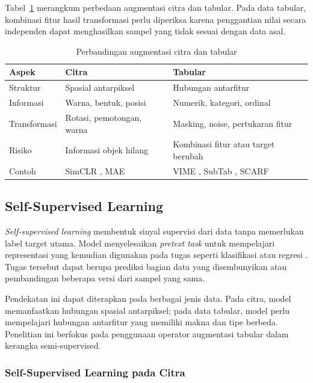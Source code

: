 Tabel~\ref{tab:i} merangkum perbedaan augmentasi citra dan tabular. Pada data tabular, kombinasi fitur hasil transformasi perlu diperiksa karena penggantian nilai secara independen dapat menghasilkan sampel yang tidak sesuai dengan data asal.

\begin{table}[!htbp]
\caption{Perbandingan augmentasi citra dan tabular}
\label{tab:i}
\centering
\footnotesize
\setlength{\tabcolsep}{3pt}
\renewcommand{\arraystretch}{1.1}
\begin{tabularx}{\columnwidth}{p{}XX}
\hline
\textbf{Aspek} & \textbf{Citra} & \textbf{Tabular} \\
\hline
Struktur & Spasial antarpiksel & Hubungan antarfitur \\
Informasi & Warna, bentuk, posisi & Numerik, kategori, ordinal \\
Transformasi & Rotasi, pemotongan, warna & Masking, noise, pertukaran fitur \\
Risiko & Informasi objek hilang & Kombinasi fitur atau target berubah \\
Contoh & SimCLR \cite{ref2}, MAE \cite{ref3} & VIME \cite{ref5}, SubTab \cite{ref6}, SCARF \cite{ref7} \\
\hline
\end{tabularx}
\end{table}

\subsection{Self-Supervised Learning}

\textit{Self-supervised learning} membentuk sinyal supervisi dari data tanpa memerlukan label target utama. Model menyelesaikan \textit{pretext task} untuk mempelajari representasi yang kemudian digunakan pada tugas seperti klasifikasi atau regresi \cite{ref4}. Tugas tersebut dapat berupa prediksi bagian data yang disembunyikan atau pembandingan beberapa versi dari sampel yang sama.

Pendekatan ini dapat diterapkan pada berbagai jenis data. Pada citra, model memanfaatkan hubungan spasial antarpiksel; pada data tabular, model perlu mempelajari hubungan antarfitur yang memiliki makna dan tipe berbeda. Penelitian ini berfokus pada penggunaan operator augmentasi tabular dalam kerangka semi-supervised.

\subsubsection{Self-Supervised Learning pada Citra}


